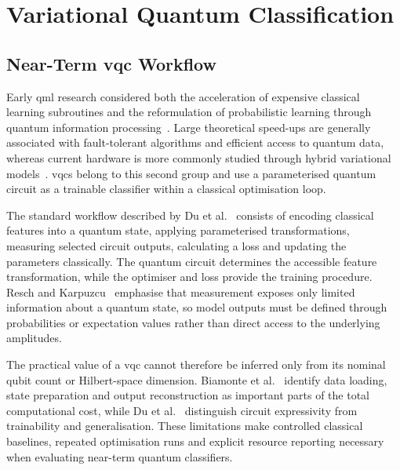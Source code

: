 \documentclass[]{UCD_CS_MSc_AAI_Report}
\begin{document}
\section{Variational Quantum Classification}
\label{sec:rw-vqc}

\subsection{Near-Term \acs*{vqc} Workflow}
Early \ac{qml} research considered both the acceleration of expensive classical learning subroutines and the reformulation of probabilistic learning through quantum information processing~\cite{schuld_introduction_2015}. Large theoretical speed-ups are generally associated with fault-tolerant algorithms and efficient access to quantum data, whereas current hardware is more commonly studied through hybrid variational models~\cite{du_quantum_2025}. \acp{vqc} belong to this second group and use a parameterised quantum circuit as a trainable classifier within a classical optimisation loop.

The standard workflow described by Du et al.~\cite{du_quantum_2025} consists of encoding classical features into a quantum state, applying parameterised transformations, measuring selected circuit outputs, calculating a loss and updating the parameters classically. The quantum circuit determines the accessible feature transformation, while the optimiser and loss provide the training procedure. Resch and Karpuzcu~\cite{resch_quantum_2019} emphasise that measurement exposes only limited information about a quantum state, so model outputs must be defined through probabilities or expectation values rather than direct access to the underlying amplitudes.

The practical value of a \ac{vqc} cannot therefore be inferred only from its nominal qubit count or Hilbert-space dimension. Biamonte et al.~\cite{biamonte_quantum_2017} identify data loading, state preparation and output reconstruction as important parts of the total computational cost, while Du et al.~\cite{du_quantum_2025} distinguish circuit expressivity from trainability and generalisation. These limitations make controlled classical baselines, repeated optimisation runs and explicit resource reporting necessary when evaluating near-term quantum classifiers.
\end{document}
